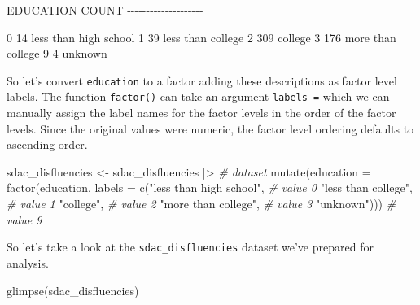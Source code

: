 \documentclass[
  letterpaper,
]{scrbook}
\newenvironment{Shaded}{\begin{snugshade}}{\end{snugshade}}
\newcommand{\AttributeTok}[1]{\textcolor[rgb]{0.00,0.00,0.00}{#1}}
\newcommand{\CommentTok}[1]{\textcolor[rgb]{0.00,0.00,0.00}{\textit{#1}}}
\newcommand{\FunctionTok}[1]{\textcolor[rgb]{0.00,0.00,0.00}{#1}}
\newcommand{\NormalTok}[1]{\textcolor[rgb]{0.00,0.00,0.00}{#1}}
\newcommand{\OtherTok}[1]{\textcolor[rgb]{0.00,0.00,0.00}{#1}}
\newcommand{\SpecialCharTok}[1]{\textcolor[rgb]{0.00,0.00,0.00}{#1}}
\newcommand{\StringTok}[1]{\textcolor[rgb]{0.00,0.00,0.00}{#1}}
\begin{document}
\begin{Shaded}
\begin{Highlighting}[]
\NormalTok{EDUCATION    COUNT}
\NormalTok{{-}{-}{-}{-}{-}{-}{-}{-}{-}{-}{-}{-}{-}{-}{-}{-}{-}{-}{-}{-}}

\NormalTok{0            14      less than high school}
\NormalTok{1            39      less than college}
\NormalTok{2            309     college}
\NormalTok{3            176     more than college}
\NormalTok{9            4       unknown}
\end{Highlighting}
\end{Shaded}

So let's convert \texttt{education} to a factor adding these
descriptions as factor level labels. The function \texttt{factor()} can
take an argument \texttt{labels\ =} which we can manually assign the
label names for the factor levels in the order of the factor levels.
Since the original values were numeric, the factor level ordering
defaults to ascending order.

\begin{Shaded}
\begin{Highlighting}[]
\NormalTok{sdac\_disfluencies }\OtherTok{\textless{}{-}} 
\NormalTok{  sdac\_disfluencies }\SpecialCharTok{|\textgreater{}} \CommentTok{\# dataset}
  \FunctionTok{mutate}\NormalTok{(}\AttributeTok{education =} \FunctionTok{factor}\NormalTok{(education, }
                            \AttributeTok{labels =} \FunctionTok{c}\NormalTok{(}\StringTok{"less than high school"}\NormalTok{, }\CommentTok{\# value 0}
                                       \StringTok{"less than college"}\NormalTok{, }\CommentTok{\# value 1}
                                       \StringTok{"college"}\NormalTok{, }\CommentTok{\# value 2}
                                       \StringTok{"more than college"}\NormalTok{, }\CommentTok{\# value 3 }
                                       \StringTok{"unknown"}\NormalTok{))) }\CommentTok{\# value 9}
\end{Highlighting}
\end{Shaded}

So let's take a look at the \texttt{sdac\_disfluencies} dataset we've
prepared for analysis.

\begin{Shaded}
\begin{Highlighting}[]
\FunctionTok{glimpse}\NormalTok{(sdac\_disfluencies)}
\end{Highlighting}
\end{Shaded}
\end{document}
